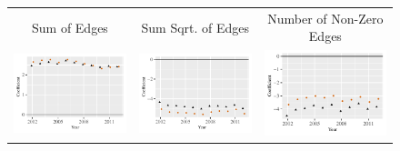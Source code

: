 \documentclass[reqno,onecolumn,letterpaper,12pt]{article}
\begin{document}
\begin{figure}[htp]
\centering
\begin{tabular}{@{\hskip -.05cm}c@{\hskip -.2cm}c@{\hskip -.2cm}c}
Sum of Edges&
Sum Sqrt. of Edges &
Number of Non-Zero Edges\\
\includegraphics[height=.165\textheight, clip=true, trim=.5cm .5cm 0cm .1cm]{figures/main_rl_plots/Sum.pdf}    &
\includegraphics[height=.165\textheight, clip=true, trim=.5cm .5cm 0cm .1cm]{figures/main_rl_plots/Sum_5.pdf}  &
 \includegraphics[height=.165\textheight, clip=true, trim=.5cm .5cm 0cm .1cm]{figures/main_rl_plots/Nonzero.pdf}\\

\end{tabular}
\end{figure}
\end{document}
